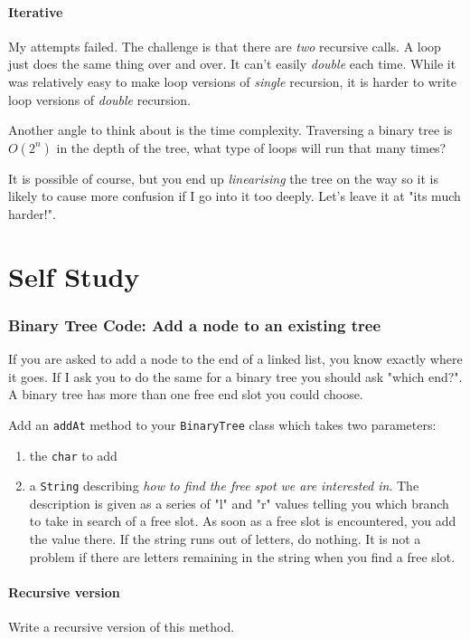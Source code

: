 \documentclass[twoside=false,DIV=14]{scrartcl}
\begin{document}
\subsection{Iterative}
My attempts failed.  The challenge is that there are \emph{two} recursive calls.  A loop just does the same thing over and over.  It can't easily \emph{double} each time.  While it was relatively easy to make loop versions of \emph{single} recursion, it is harder to write loop versions of \emph{double} recursion.

Another angle to think about is the time complexity.  Traversing a binary tree is $O(2^n)$ in the depth of the tree, what type of loops will run that many times?

It is possible of course, but you end up \emph{linearising} the tree on the way so it is likely to cause more confusion if I go into it too deeply.  Let's leave it at "its much harder!".

\newpage\setcounter{section}{0}
\part*{Self Study}

\section{Binary Tree Code: Add a node to an existing tree}
If you are asked to add a node to the end of a linked list, you know exactly where it goes.  If I ask you to do the same for a binary tree you should ask "which end?".  A binary tree has more than one free end slot you could choose.

Add an \verb+addAt+ method to your \verb+BinaryTree+ class which takes two parameters:
\begin{enumerate}
\item the \verb+char+ to add
\item a \verb+String+ describing \emph{how to find the free spot we are interested in}.  The description is given as a series of "l" and "r" values telling you which branch to take in search of a free slot.  As soon as a free slot is encountered, you add the value there.  If the string runs out of letters, do nothing.  It is not a problem if there are letters remaining in the string when you find a free slot.
\end{enumerate}

\subsection{Recursive version}
Write a recursive version of this method.
\end{document}

